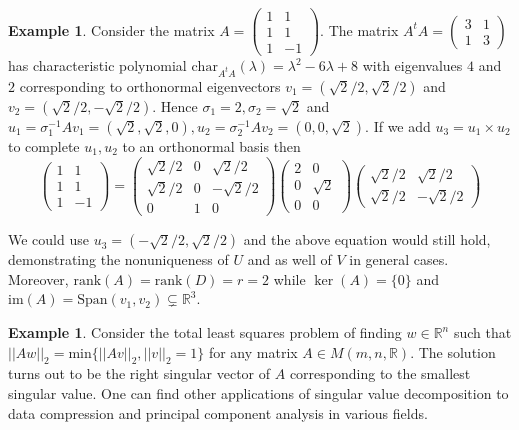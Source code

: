 \documentclass[12pt]{amsart}
\theoremstyle{definition}
\newtheorem{example}[theorem]{Example}
\begin{document}
\begin{example}\label{} Consider the matrix $A = \left(\begin{array}{cc} 1 & 1 \\ 1 & 1 \\ 1 & -1 \end{array}\right)$. The matrix $A^tA = \left(\begin{array}{cc} 3 & 1\\ 1 & 3 \end{array}\right)$ has characteristic polynomial $\text{char}_{A^tA}(\lambda) = \lambda^2 - 6 \lambda + 8$ with eigenvalues $4$ and $2$ corresponding to orthonormal eigenvectors $v_1 = (\sqrt{2}/2, \sqrt{2}/2)$ and $v_2 = (\sqrt{2}/2, -\sqrt{2}/2)$. Hence $\sigma_1 = 2, \sigma_2 = \sqrt{2}$ and $u_1 = \sigma_1^{-1}Av_1 = (\sqrt{2}, \sqrt{2}, 0), u_2 = \sigma_2^{-1}Av_2 = (0, 0, \sqrt{2})$. If we add $u_3 = u_1 \times u_2$ to complete $u_1, u_2$ to an orthonormal basis then
$$\left(\begin{array}{cc} 1 & 1 \\ 1 & 1 \\ 1 & -1 \end{array}\right) = \left(\begin{array}{ccc} \sqrt{2}/2 & 0 & \sqrt{2}/2 \\ \sqrt{2}/2 & 0 & -\sqrt{2}/2 \\ 0 & 1 & 0 \end{array}\right) \left(\begin{array}{cc} 2 & 0 \\ 0 & \sqrt{2} \\ 0 & 0 \end{array}\right) \left(\begin{array}{cc} \sqrt{2}/2 & \sqrt{2}/2 \\ \sqrt{2}/2 & -\sqrt{2}/2 \end{array}\right)$$

We could use $u_3 = (-\sqrt{2}/2, \sqrt{2}/2)$ and the above equation would still hold, demonstrating the nonuniqueness of $U$ and as well of $V$ in general cases. Moreover, $\text{rank}(A) = \text{rank}(D) = r = 2$ while $\ker(A) = \{0\}$ and $\text{im}(A) = \text{Span}(v_1, v_2) \subsetneq \mathbb{R}^3$.
\end{example}

\begin{example}\label{} Consider the total least squares problem of finding $w \in \mathbb{R}^n$ such that $||Aw||_2 = \text{min}\{||Av||_2, ||v||_2 = 1\}$ for any matrix $A \in M(m, n, \mathbb{R})$. The solution turns out to be the right singular vector of $A$ corresponding to the smallest singular value. One can find other applications of singular value decomposition to data compression and principal component analysis in various fields.
\end{example}
\end{document}
